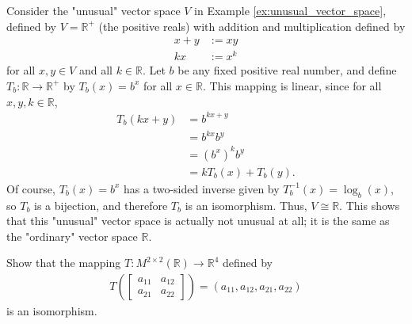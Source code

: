 \documentclass[12pt,letterpaper,reqno]{article}
\numberwithin{equation}{section}
\newcommand{\R}{\ensuremath{\mathbb R}}
\begin{document}
\begin{example}
	Consider the "unusual" vector space $V$ in Example \ref{ex:unusual_vector_space}, defined by $V=\R^+$ (the positive reals) with addition and multiplication defined by
	\begin{align*}
		x+y&:=xy \\
		kx&:=x^k 
	\end{align*}
	for all $x,y \in V$ and all $k \in \R$. Let $b$ be any fixed positive real number, and define $T_b:\R \to \R^+$ by $T_b(x)=b^x$ for all $x \in \R$. This mapping is linear, since for all $x,y,k \in \R$, 
	\begin{align*}
		T_b(kx+y)&=b^{kx+y} \\
		&=b^{kx}b^y \\
		&=(b^x)^kb^y \\
		&=kT_b(x)+T_b(y).
	\end{align*}
	Of course, $T_b(x)=b^x$ has a two-sided inverse given by $T_b^{-1}(x)=\log_b(x)$, so $T_b$ is a bijection, and therefore $T_b$ is an isomorphism. Thus, $V \cong \R$. This shows that this "unusual" vector space is actually not unusual at all; it is the same as the "ordinary" vector space $\R$.
\end{example}

\begin{exercise}\label{ex:matrix_of_a_linear_transformation_of_r_n_to_r_m}
Show that the mapping $T:M^{2 \times 2}(\R) \to \R^4$ defined by
\begin{align*}
	T\left(\begin{bmatrix}
		a_{11} & a_{12} \\
		a_{21} & a_{22}
	\end{bmatrix}\right)=(a_{11},a_{12},a_{21},a_{22})
\end{align*}	
is an isomorphism.
\end{exercise}
\end{document}
